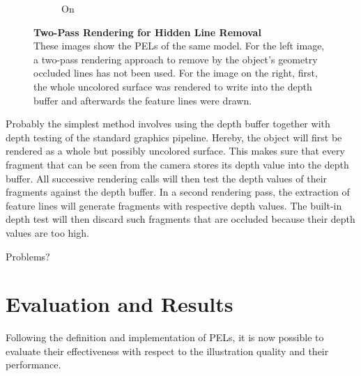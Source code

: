 \documentclass[9pt,fleqn,twoside,twocolumn]{stdglobal}
\begin{document}
\begin{figure}[h]
\begin{subfigure}[b]{0.49\linewidth}
        \caption{On}
      \end{subfigure}
      \caption{%
        \textbf{Two-Pass Rendering for Hidden Line Removal}\\
        These images show the PELs of the same model.
        For the left image, a two-pass rendering approach to remove by the object's geometry occluded lines has not been used.
        For the image on the right, first, the whole uncolored surface was rendered to write into the depth buffer and afterwards the feature lines were drawn.
      }
      \label{fig:hidden-line-removal}
    \end{figure}

    Probably the simplest method involves using the depth buffer together with depth testing of the standard graphics pipeline.
    Hereby, the object will first be rendered as a whole but possibly uncolored surface.
    This makes sure that every fragment that can be seen from the camera stores its depth value into the depth buffer.
    All successive rendering calls will then test the depth values of their fragments against the depth buffer.
    In a second rendering pass, the extraction of feature lines will generate fragments with respective depth values.
    The built-in depth test will then discard such fragments that are occluded because their depth values are too high.

    Problems?


\section{Evaluation and Results}
  Following the definition and implementation of PELs, it is now possible to evaluate their effectiveness with respect to the illustration quality and their performance.
\end{document}
